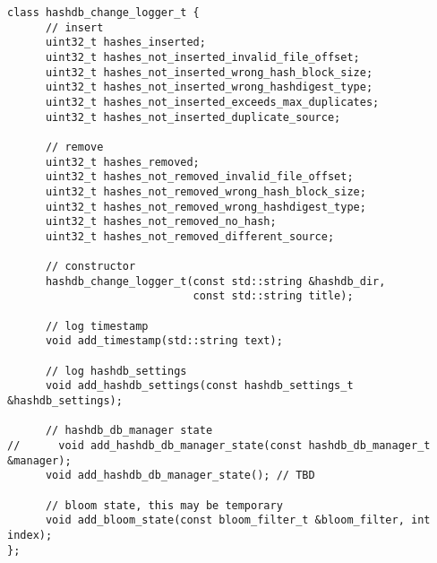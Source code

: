 \documentclass[12pt,twoside]{article}
\begin{document}
\begin{small}
\begin{verbatim}
class hashdb_change_logger_t {
      // insert
      uint32_t hashes_inserted;
      uint32_t hashes_not_inserted_invalid_file_offset;
      uint32_t hashes_not_inserted_wrong_hash_block_size;
      uint32_t hashes_not_inserted_wrong_hashdigest_type;
      uint32_t hashes_not_inserted_exceeds_max_duplicates;
      uint32_t hashes_not_inserted_duplicate_source;

      // remove
      uint32_t hashes_removed;
      uint32_t hashes_not_removed_invalid_file_offset;
      uint32_t hashes_not_removed_wrong_hash_block_size;
      uint32_t hashes_not_removed_wrong_hashdigest_type;
      uint32_t hashes_not_removed_no_hash;
      uint32_t hashes_not_removed_different_source;

      // constructor
      hashdb_change_logger_t(const std::string &hashdb_dir,
                             const std::string title);

      // log timestamp
      void add_timestamp(std::string text);

      // log hashdb_settings
      void add_hashdb_settings(const hashdb_settings_t &hashdb_settings);

      // hashdb_db_manager state
//      void add_hashdb_db_manager_state(const hashdb_db_manager_t &manager);
      void add_hashdb_db_manager_state(); // TBD

      // bloom state, this may be temporary
      void add_bloom_state(const bloom_filter_t &bloom_filter, int index);
};
\end{verbatim}
\end{small}

\end{document}
